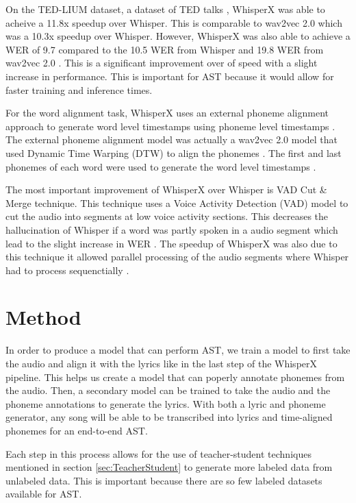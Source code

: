 \documentclass[letterpaper, 12pt]{article}
\begin{document}
\begin{multicols*}{2}
On the TED-LIUM dataset, a dataset of TED talks \citep{tedlium3}, WhisperX was able to acheive a
11.8x speedup over Whisper. This is comparable to wav2vec 2.0 which was a 10.3x speedup over
Whisper. However, WhisperX was also able to achieve a WER of 9.7 compared to the 10.5 WER from
Whisper and 19.8 WER from wav2vec 2.0 \citep{whisperX}. This is a significant improvement over
of speed with a slight increase in performance. This is important for AST because it would allow
for faster training and inference times.

For the word alignment task, WhisperX uses an external phoneme alignment approach to generate
word level timestamps using phoneme level timestamps \citep{whisperX}. The external phoneme
alignment model was actually a wav2vec 2.0 model that used Dynamic Time Warping (DTW) \citep{DTW}
to align the phonemes \citep{whisperX}. The first and last phonemes of each word were used to
generate the word level timestamps \citep{whisperX}.

The most important improvement of WhisperX over Whisper is VAD Cut \& Merge technique. This
technique uses a Voice Activity Detection (VAD) model to cut the audio into segments at low voice
activity sections. This decreases the hallucination of Whisper if a word was partly spoken in a
audio segment which lead to the slight increase in WER \citep{whisperX}. The speedup of WhisperX
was also due to this technique it allowed parallel processing of the audio segments where
Whisper had to process sequenctially \citep{whisperX}.


\section{Method}
In order to produce a model that can perform AST, we train a model to first take the audio and align
it with the lyrics like in the last step of the WhisperX pipeline. This helps us create a model that
can poperly annotate phonemes from the audio. Then, a secondary model can be trained to take the
audio and the phoneme annotations to generate the lyrics. With both a lyric and phoneme generator,
any song will be able to be transcribed into lyrics and time-aligned phonemes for an end-to-end AST.

Each step in this process allows for the use of teacher-student techniques mentioned in section
\ref{sec:TeacherStudent} to generate more labeled data from unlabeled data. This is important
because there are so few labeled datasets available for AST.


\end{multicols*}
\end{document}
